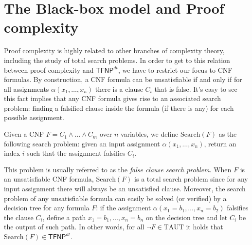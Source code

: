 \section{The Black-box model and Proof complexity}

Proof complexity is highly related to other branches of complexity theory, including the study of total search problems. In order to get to this relation between proof complexity and $\mathsf{TFNP}^{dt}$, we have to restrict our focus to CNF formulas. By construction, a CNF formula can be unsatisfiable if and only if for all assignments $\alpha(x_1, \ldots, x_n)$ there is a clause $C_i$ that is false. It's easy to see this fact implies that any CNF formula gives rise to an associated search problem: finding a falsified clause inside the formula (if there is any) for each possible assignment.

\begin{definition}
 Given a CNF $F = C_1 \land \ldots \land C_m$ over $n$ variables, we define $\mathrm{Search}(F)$ as the following search problem: given an input assignment $\alpha(x_1, \ldots, x_n)$, return an index $i$ such that the assignment falsifies $C_i$.
\end{definition}

This problem is usually referred to as the \textit{false clause search problem}. When $F$ is an unsatisfiable CNF formula, $\mathrm{Search}(F)$ is a total search problem since for any input assignment there will always be an unsatisfied clause. Moreover, the search problem of any unsatisfiable formula can easily be solved (or verified) by a decision tree for any formula $F$: if the assignment $\alpha(x_1 = b_1, \ldots, x_n = b_2)$ falsifies the clause $C_i$, define a path $x_1 = b_1, \ldots, x_n = b_n$ on the decision tree and let $C_i$ be the output of such path. In other words, for all $\lnot F \in \mathrm{TAUT}$ it holds that $\mathrm{Search}(F) \in \mathsf{TFNP}^{dt}$. 

\newpage

